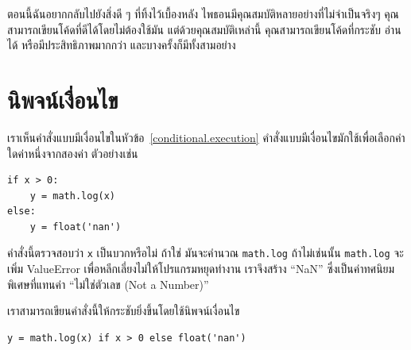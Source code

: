 ตอนนี้ฉันอยากกลับไปยังสิ่งดี ๆ ที่ทิ้งไว้เบื้องหลัง ไพธอนมีคุณสมบัติหลายอย่างที่ไม่จำเป็นจริงๆ คุณสามารถเขียนโค้ดที่ดีได้โดยไม่ต้องใช้มัน 
แต่ด้วยคุณสมบัติเหล่านี้ คุณสามารถเขียนโค้ดที่กระชับ อ่านได้ หรือมีประสิทธิภาพมากกว่า และบางครั้งก็มีทั้งสามอย่าง



\section{นิพจน์เงื่อนไข} %

เราเห็นคำสั่งแบบมีเงื่อนไขในหัวข้อ~\ref{conditional.execution} คำสั่งแบบมีเงื่อนไขมักใช้เพื่อเลือกค่าใดค่าหนึ่งจากสองค่า ตัวอย่างเช่น

\begin{verbatim}
if x > 0:
    y = math.log(x)
else:
    y = float('nan')
\end{verbatim}

คำสั่งนี้ตรวจสอบว่า {\tt x} เป็นบวกหรือไม่ ถ้าใช่ มันจะคำนวณ {\tt math.log} ถ้าไม่เช่นนั้น {\tt math.log} จะเพิ่ม ValueError 
เพื่อหลีกเลี่ยงไม่ให้โปรแกรมหยุดทำงาน เราจึงสร้าง ``NaN'' ซึ่งเป็นค่าทศนิยมพิเศษที่แทนค่า ``ไม่ใช่ตัวเลข (Not a Number)''

เราสามารถเขียนคำสั่งนี้ให้กระชับยิ่งขึ้นโดยใช้นิพจน์เงื่อนไข

\begin{verbatim}
y = math.log(x) if x > 0 else float('nan')
\end{verbatim}

